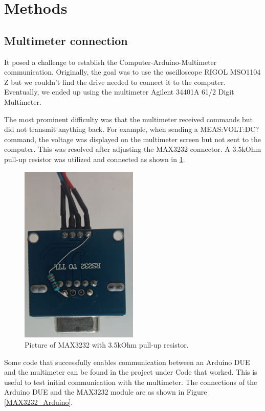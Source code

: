 \section{Methods}

\subsection{Multimeter connection}
It posed a challenge to establish the Computer-Arduino-Multimeter communication. Originally, the goal was to use the oscilloscope RIGOL MSO1104 Z but we couldn't find the drive needed to connect it to the computer. Eventually, we ended up using the multimeter Agilent 34401A 61/2 Digit Multimeter\cite{keysight34401A}. 

The most prominent difficulty was that the multimeter received commands but did not transmit anything back. For example, when sending a MEAS:VOLT:DC? command, the voltage was displayed on the multimeter screen but not sent to the computer. This was resolved after adjusting the MAX3232 connector. A 3.5kOhm pull-up resistor was utilized and connected as shown in \ref{MAX3232}.

\begin{figure}[H]
          \centering
          \includegraphics[angle=90, width=0.5\textwidth]{img/RS232_connector.jpeg}
          \caption{Picture of MAX3232 with 3.5kOhm pull-up resistor.}
          \label{MAX3232}
    \end{figure}

Some code that successfully enables communication between an Arduino DUE and the multimeter can be found in the project under Code that worked. This is useful to test initial communication with the multimeter. The connections of the Arduino DUE and the MAX3232 module are as shown in Figure \ref{MAX3232_Arduino}.

